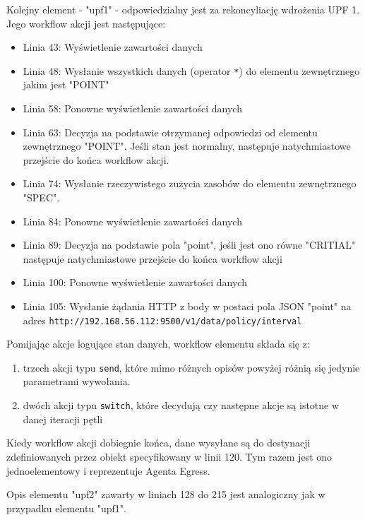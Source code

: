 Kolejny element - "upf1" - odpowiedzialny jest za rekoncyliację wdrożenia UPF 1. Jego workflow akcji jest następujące:
\begin{itemize}
  \item Linia 43: Wyświetlenie zawartości danych
  \item Linia 48: Wysłanie wszystkich danych (operator \texttt{*}) do elementu zewnętrznego jakim jest "POINT"
  \item Linia 58: Ponowne wyświetlenie zawartości danych
  \item Linia 63: Decyzja na podstawie otrzymanej odpowiedzi od elementu zewnętrznego "POINT". Jeśli stan jest normalny, następuje natychmiastowe przejście do końca workflow akcji.
  \item Linia 74: Wysłanie rzeczywistego zużycia zasobów do elementu zewnętrznego "SPEC".
  \item Linia 84: Ponowne wyświetlenie zawartości danych
  \item Linia 89: Decyzja na podstawie pola "point", jeśli jest ono równe "CRITIAL" następuje natychmiastowe przejście do końca workflow akcji
  \item Linia 100: Ponowne wyświetlenie zawartości danych
  \item Linia 105: Wysłanie żądania HTTP z body w postaci pola JSON "point" na adres \texttt{http://192.168.56.112:9500/v1/data/policy/interval}
\end{itemize}

Pomijając akcje logujące stan danych, workflow elementu składa się z:
\begin{enumerate}
  \item trzech akcji typu \texttt{send}, które mimo różnych opisów powyżej różnią się jedynie parametrami wywołania.
  \item dwóch akcji typu \texttt{switch}, które decydują czy następne akcje są istotne w danej iteracji pętli
\end{enumerate} 

Kiedy workflow akcji dobiegnie końca, dane wysyłane są do destynacji zdefiniowanych przez obiekt specyfikowany w linii 120. Tym razem jest ono jednoelementowy i reprezentuje Agenta Egress.

Opis elementu "upf2" zawarty w liniach 128 do 215 jest analogiczny jak w przypadku elementu "upf1".